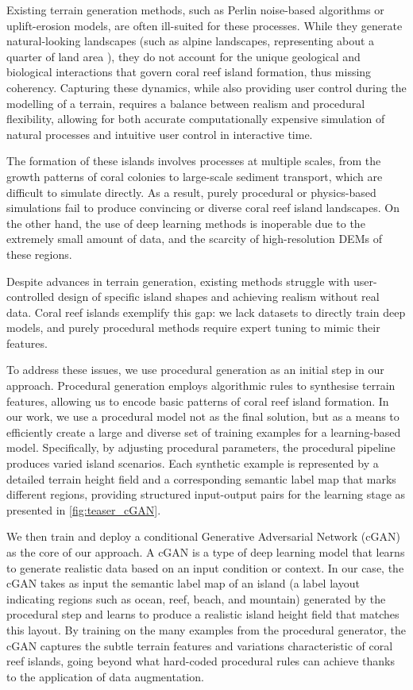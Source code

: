 Existing terrain generation methods, such as Perlin noise-based algorithms or uplift-erosion models, are often ill-suited for these processes. While they generate natural-looking landscapes (such as alpine landscapes, representing about a quarter of land area \cite{Korner2014}), they do not account for the unique geological and biological interactions that govern coral reef island formation, thus missing coherency. Capturing these dynamics, while also providing user control during the modelling of a terrain, requires a balance between realism and procedural flexibility, allowing for both accurate computationally expensive simulation of natural processes and intuitive user control in interactive time.

The formation of these islands involves processes at multiple scales, from the growth patterns of coral colonies to large-scale sediment transport, which are difficult to simulate directly. As a result, purely procedural or physics-based simulations fail to produce convincing or diverse coral reef island landscapes. On the other hand, the use of deep learning methods is inoperable due to the extremely small amount of data, and the scarcity of high-resolution DEMs of these regions.

Despite advances in terrain generation, existing methods struggle with user-controlled design of specific island shapes and achieving realism without real data. Coral reef islands exemplify this gap: we lack datasets to directly train deep models, and purely procedural methods require expert tuning to mimic their features.

To address these issues, we use procedural generation as an initial step in our approach. Procedural generation employs algorithmic rules to synthesise terrain features, allowing us to encode basic patterns of coral reef island formation. In our work, we use a procedural model not as the final solution, but as a means to efficiently create a large and diverse set of training examples for a learning-based model. Specifically, by adjusting procedural parameters, the procedural pipeline produces varied island scenarios. Each synthetic example is represented by a detailed terrain height field and a corresponding semantic label map that marks different regions, providing structured input-output pairs for the learning stage as presented in \cref{fig:teaser_cGAN}.

We then train and deploy a conditional Generative Adversarial Network (cGAN) as the core of our approach. A cGAN is a type of deep learning model that learns to generate realistic data based on an input condition or context. In our case, the cGAN takes as input the semantic label map of an island (a label layout indicating regions such as ocean, reef, beach, and mountain) generated by the procedural step and learns to produce a realistic island height field that matches this layout. By training on the many examples from the procedural generator, the cGAN captures the subtle terrain features and variations characteristic of coral reef islands, going beyond what hard-coded procedural rules can achieve thanks to the application of data augmentation.

